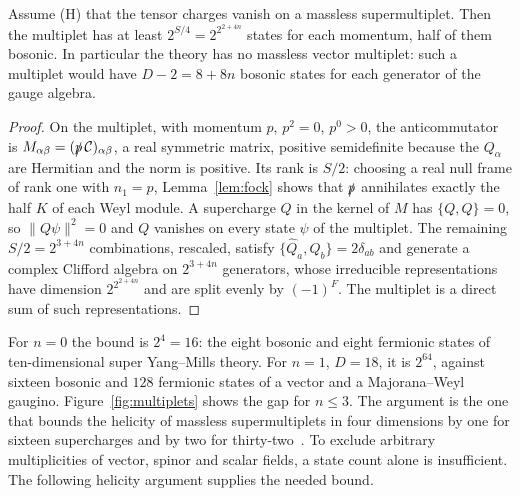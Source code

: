 \begin{theorem}
\label{thm:singletime}
Assume (H) that the tensor charges vanish on a massless supermultiplet. Then the multiplet has at least $2^{S/4}=2^{2^{2+4n}}$ states for each momentum, half of them bosonic. In particular the theory has no massless vector multiplet: such a multiplet would have $D-2=8+8n$ bosonic states for each generator of the gauge algebra.
\end{theorem}

\begin{proof}
On the multiplet, with momentum $p$, $p^2=0$, $p^0>0$, the anticommutator is $M_{\alpha\beta}=(\slashed{p}\,\mathcal C)_{\alpha\beta}$, a real symmetric matrix, positive semidefinite because the $Q_\alpha$ are Hermitian and the norm is positive. Its rank is $S/2$: choosing a real null frame of rank one with $n_1=p$, Lemma~\ref{lem:fock} shows that $\slashed p$ annihilates exactly the half $K$ of each Weyl module. A supercharge $Q$ in the kernel of $M$ has $\{Q,Q\}=0$, so $\|Q\psi\|^2=0$ and $Q$ vanishes on every state $\psi$ of the multiplet. The remaining $S/2=2^{3+4n}$ combinations, rescaled, satisfy $\{\hat Q_a,\hat Q_b\}=2\delta_{ab}$ and generate a complex Clifford algebra on $2^{3+4n}$ generators, whose irreducible representations have dimension $2^{2^{2+4n}}$ and are split evenly by $(-1)^F$. The multiplet is a direct sum of such representations.
\end{proof}

For $n=0$ the bound is $2^4=16$: the eight bosonic and eight fermionic states of ten-dimensional super Yang--Mills theory. For $n=1$, $D=18$, it is $2^{64}$, against sixteen bosonic and $128$ fermionic states of a vector and a Majorana--Weyl gaugino. Figure~\ref{fig:multiplets} shows the gap for $n\le3$. The argument is the one that bounds the helicity of massless supermultiplets in four dimensions by one for sixteen supercharges and by two for thirty-two~\cite{Nahm1978,Strathdee1987}. To exclude arbitrary multiplicities of vector, spinor and scalar fields, a state count alone is insufficient. The following helicity argument supplies the needed bound.

